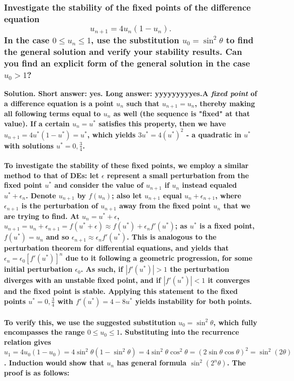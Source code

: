 \documentclass{article}
\begin{document}
\hrulefill

\subsubsection*{Investigate the stability of the fixed points of the difference equation
\begin{equation*}
    u_{n+1} = 4u_n(1-u_n).
\end{equation*}
In the case $0\leq u_n \leq 1$, use the substitution $u_0 = \sin^2 \theta$ to find the general solution and verify your stability results. Can you find an explicit form of the general solution in the case $u_0 > 1$?
}
\bf Solution. \normalfont Short answer: yes. Long answer: yyyyyyyyyes.\newpage A \textit{fixed point} of a difference equation is a point $u_n$ such that $u_{n+1}=u_n$, thereby making all following terms equal to $u_n$ as well (the sequence is "fixed" at that value). If a certain $u_n = u^*$ satisfies this property, then we have $u_{n+1} = 4u^*(1-u^*) = u^*$, which yields $3u^*=4(u^*)^2$ - a quadratic in $u^*$ with solutions $u^* = 0, \frac{3}{4}$. \\ \\
To investigate the stability of these fixed points, we employ a similar method to that of DEs: let $\epsilon$ represent a small perturbation from the fixed point $u^*$ and consider the value of $u_{n+1}$ if $u_n$ instead equaled $u^* + \epsilon_n$. Denote $u_{n+1}$ by $f(u_n)$; also let $u_{n+1}$ equal $u_n + \epsilon_{n+1}$, where $\epsilon_{n+1}$ is the perturbation of $u_{n+1}$ away from the fixed point $u_n$ that we are trying to find. At $u_n = u^* + \epsilon$, $u_{n+1} = u_n + \epsilon_{n+1} = f(u^* + \epsilon) \approx f(u^*) + \epsilon_n f'(u^*)$; as $u^*$ is a fixed point, $f(u^*) = u_n$ and so $\epsilon_{n+1} \approx \epsilon_n f'(u^*)$. This is analogous to the perturbation theorem for differential equations, and yields that $\epsilon_{n} = \epsilon_0 [f'(u^*)]^n$ due to it following a geometric progression, for some initial perturbation $\epsilon_0$. As such, if $|f'(u^*)| > 1$ the perturbation diverges with an unstable fixed point, and if $|f'(u^*)| < 1$ it converges and the fixed point is stable. Applying this statement to the fixed points $u^* = 0, \frac{3}{4}$ with $f'(u^*) = 4 - 8u^*$ yields instability for both points. 
\\ \\
To verify this, we use the suggested substitution $u_0 = \sin^2 \theta$, which fully encompasses the range $0 \leq u_0 \leq 1$. Substituting into the recurrence relation gives $u_1 = 4u_0(1-u_0) = 4\sin^2 \theta (1-\sin^2 \theta) = 4\sin^2 \theta \cos^2 \theta = (2\sin \theta \cos \theta)^2 = \sin^2 (2\theta)$. Induction would show that $u_n$ has general formula $\sin^2 (2^n \theta)$. The proof is as follows:
\end{document}
